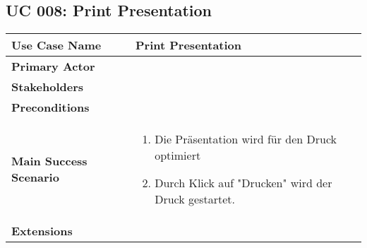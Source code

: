 \subsection{UC 008: Print Presentation}
\label{uc:008-print-pres}

\begin{tabular}{|l|p{}|}
\hline
\textbf{Use Case Name} 	&	Print Presentation	\\ \hline
\textbf{Primary Actor} 	&		\\ \hline
\textbf{Stakeholders}	&		\\ \hline
\textbf{Preconditions}	&		\\ \hline
\textbf{Main Success Scenario}	&
\begin{enumerate}
	\item Die Präsentation wird für den Druck optimiert
	\item Durch Klick auf "Drucken" wird der Druck gestartet.
\end{enumerate}
\\ \hline
\textbf{Extensions}	& 	\\ \hline
\end{tabular}